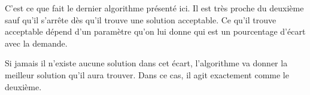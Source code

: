 C'est ce que fait le dernier algorithme présenté ici. Il est très proche du deuxième sauf qu'il s'arrête dès qu'il trouve une solution acceptable. Ce qu'il trouve acceptable dépend d'un paramètre qu'on lui donne qui est un pourcentage d'écart avec la demande.

Si jamais il n'existe aucune solution dans cet écart, l'algorithme va donner la meilleur solution qu'il aura trouver. Dans ce cas, il agit exactement comme le deuxième.